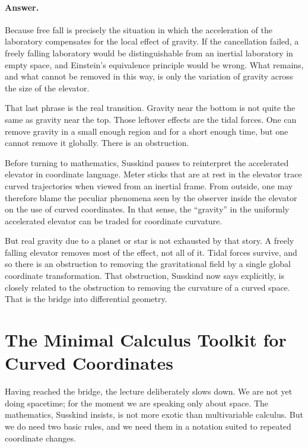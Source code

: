 \paragraph{Answer.} Because free fall is precisely the situation in which the acceleration of the laboratory compensates for the local effect of gravity. If the cancellation failed, a freely falling laboratory would be distinguishable from an inertial laboratory in empty space, and Einstein's equivalence principle would be wrong. What remains, and what cannot be removed in this way, is only the variation of gravity across the size of the elevator.

That last phrase is the real transition. Gravity near the bottom is not quite the same as gravity near the top. Those leftover effects are the tidal forces. One can remove gravity in a small enough region and for a short enough time, but one cannot remove it globally. There is an obstruction.

Before turning to mathematics, Susskind pauses to reinterpret the accelerated elevator in coordinate language. Meter sticks that are at rest in the elevator trace curved trajectories when viewed from an inertial frame. From outside, one may therefore blame the peculiar phenomena seen by the observer inside the elevator on the use of curved coordinates. In that sense, the ``gravity'' in the uniformly accelerated elevator can be traded for coordinate curvature.

But real gravity due to a planet or star is not exhausted by that story. A freely falling elevator removes most of the effect, not all of it. Tidal forces survive, and so there is an obstruction to removing the gravitational field by a single global coordinate transformation. That obstruction, Susskind now says explicitly, is closely related to the obstruction to removing the curvature of a curved space. That is the bridge into differential geometry.

\section{The Minimal Calculus Toolkit for Curved Coordinates}

Having reached the bridge, the lecture deliberately slows down. We are not yet doing spacetime; for the moment we are speaking only about space. The mathematics, Susskind insists, is not more exotic than multivariable calculus. But we do need two basic rules, and we need them in a notation suited to repeated coordinate changes.

